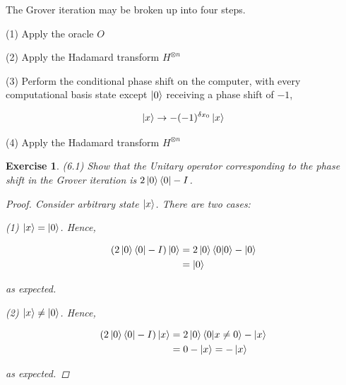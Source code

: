 \documentclass[11pt]{article}
\newcommand\0{\mathbf{0}}
\newcommand\<{\langle}
\renewcommand\>{\rangle}
\newtheorem{exercise}[theorem]{Exercise}
\begin{document}
The Grover iteration may be broken up into four steps.

(1) Apply the oracle $O$

(2) Apply the Hadamard transform $H^{\otimes n}$

(3) Perform the conditional phase shift on the computer, with every computational basis
state except $\ket{0}$ receiving a phase shift of $-1$,

$$ \ket{x} \rightarrow -(-1)^{\delta x_0} \ket{x} $$

(4) Apply the Hadamard transform $H^{\otimes n}$

\begin{exercise}(6.1) Show that the Unitary operator corresponding to the phase shift in the Grover iteration is $2 \ket{0}\bra{0} - I$.
	\begin{proof}
	Consider arbitrary state $\ket{x}$. There are two cases:
	
	(1) $\ket{x} = \ket{0}$. Hence, 
	
	\begin{align*}
 	(2 \ket{0}\bra{0} - I)\ket{0} &= 2\ket{0}\bra{0}\ket{0} - \ket{0} \\
 	&= \ket{0}
 \end{align*}

as expected.

(2) $\ket{x} \neq \ket{0}$. Hence, 
	
	\begin{align*}
 	(2 \ket{0}\bra{0} - I)\ket{x} &= 2\ket{0}\bra{0}\ket{x \neq 0} - \ket{x} \\
 	&= 0 - \ket{x} = -\ket{x}
 \end{align*}

as expected.
	\end{proof}

\end{exercise}
\end{document}
